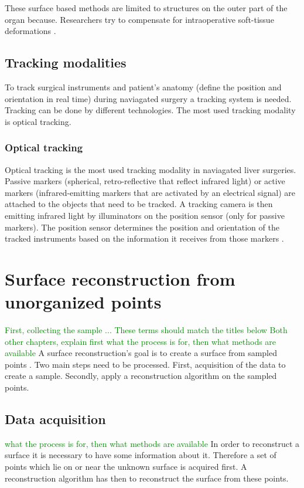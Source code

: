 These surface based methods are limited to structures on the outer part of the
organ because. 
Researchers try to compensate for intraoperative soft-tissue deformations
\cite{cash2005compensating}\cite{dagon2008real}.
\subsection{Tracking modalities}
To track surgical instruments and patient's anatomy (define the position and
orientation in real time) during naviagated surgery a tracking system is needed.
Tracking can be done by different technologies. The most used tracking
modality is optical tracking. 

\subsubsection{Optical tracking}
Optical tracking is the most used tracking modality in naviagated liver
surgeries. Passive markers (spherical, retro-reflective that reflect infrared
light) or active markers (infrared-emitting markers that are activated by an
electrical signal) \cite{wiles2004accuracy} are attached to the objects that
need to be tracked. A tracking camera is then emitting infrared light by illuminators
on the position sensor (only for passive markers). The position sensor
determines the position and orientation of the tracked instruments based on the
information it receives from those markers \cite{noauthor_polaris_nodate}.  

\section{Surface reconstruction from unorganized points}
\textcolor{green}{First, collecting the sample ... These terms should match the titles below
Both other chapters, explain first what the process is for, then what methods are available}
A surface reconstruction's goal is to create a surface from sampled points \cite{berger2017survey}. Two
main steps need to be processed. First, acquisition of the data to create a sample. Secondly,
apply a reconstruction algorithm on the sampled points.
\subsection{Data acquisition}
\textcolor{green}{what the process is for, then what methods are available}
In order to reconstruct a surface it is necessary to have some information about
it. Therefore a set of points which lie on or near the unknown surface is acquired first. A
reconstruction algorithm has then to reconstruct the surface from these points.

